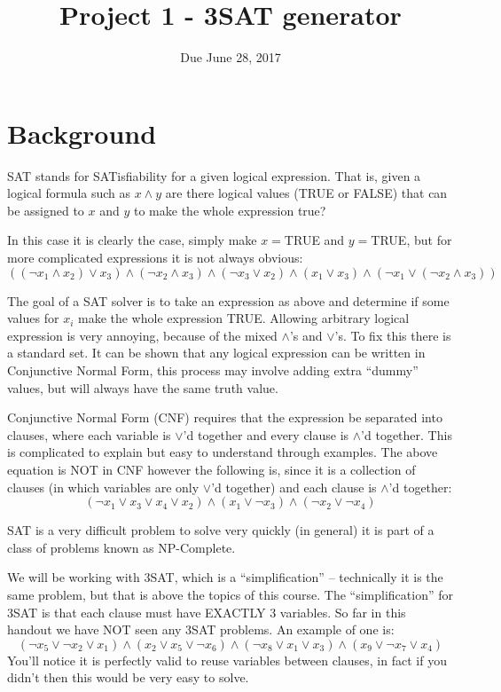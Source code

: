 \documentclass{article}
\title{Project 1 - 3SAT generator}
\author{Due June 28, 2017}
\date{}
\begin{document}
\maketitle

\section{Background}
SAT stands for SATisfiability for a given logical expression. That is, given a
logical formula such as $x \wedge y$ are there logical values (TRUE or FALSE)
that can be assigned to $x$ and $y$ to make the whole expression true?

In this case it is clearly the case, simply make $x = $TRUE and $y = $TRUE, but
for more complicated expressions it is not always obvious:
\[
  ((\neg x_1\wedge x_2)\vee x_3) \wedge (\neg x_2 \wedge x_3) \wedge (\neg x_3
  \vee x_2) \wedge (x_1 \vee x_3) \wedge (\neg x_1 \vee (\neg x_2 \wedge x_3))
\]

The goal of a SAT solver is to take an expression as above and determine if some
values for $x_i$ make the whole expression TRUE. Allowing arbitrary logical
expression is very annoying, because of the mixed $\wedge$'s and $\vee$'s. To
fix this there is a standard set. It can be shown that any logical expression
can be written in Conjunctive Normal Form, this process may involve adding extra
``dummy'' values, but will always have the same truth value.

Conjunctive Normal Form (CNF) requires that the expression be separated into
clauses, where each variable is $\vee$'d together and every clause is $\wedge$'d
together. This is complicated to explain but easy to understand through
examples. The above equation is NOT in CNF however the following is, since it is
a collection of clauses (in which variables are only $\vee$'d together) and each
clause is $\wedge$'d together:
\[
  (\neg x_1 \vee x_3 \vee x_4 \vee x_2) \wedge (x_1 \vee \neg x_3) \wedge (\neg
  x_2 \vee \neg x_4)
\]

SAT is a very difficult problem to solve very quickly (in general) it is part of
a class of problems known as NP-Complete.

We will be working with 3SAT, which is a ``simplification'' -- technically it is
the same problem, but that is above the topics of this course. The
``simplification'' for 3SAT is that each clause must have EXACTLY 3 variables.
So far in this handout we have NOT seen any 3SAT problems. An example of one is:
\[
  (\neg x_5 \vee \neg x_2 \vee x_1) \wedge (x_2 \vee x_5 \vee \neg x_6) \wedge 
  (\neg x_8 \vee x_1 \vee x_3) \wedge (x_9 \vee \neg x_7 \vee x_4)
\]
You'll notice it is perfectly valid to reuse variables between clauses, in fact
if you didn't then this would be very easy to solve.
\end{document}
